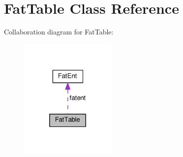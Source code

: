 \hypertarget{classFatTable}{}\section{Fat\+Table Class Reference}
\label{classFatTable}


Collaboration diagram for Fat\+Table\+:
\nopagebreak
\begin{figure}[H]
\begin{center}
\leavevmode
\includegraphics[width=136pt]{classFatTable__coll__graph}
\end{center}
\end{figure}
